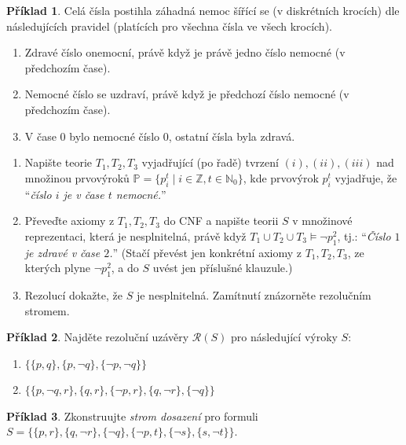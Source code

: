 \documentclass[a4paper]{article}
\theoremstyle{plain}
\theoremstyle{definition}
\newtheorem{problem}{Příklad}
\begin{document}
\medskip\begin{problem}
Celá čísla postihla záhadná nemoc šířící se (v diskrétních krocích) dle následujících pravidel (platících pro všechna čísla ve všech krocích).
\begin{enumerate}[label=(\roman*)]\it
\item Zdravé číslo onemocní, právě když je právě jedno číslo nemocné (v předchozím čase).
\item Nemocné číslo se uzdraví, právě když je předchozí číslo nemocné (v předchozím čase).
\item V čase $0$ bylo nemocné číslo $0$, ostatní čísla byla zdravá.
\end{enumerate}
\begin{enumerate}
\item Napište teorie $T_1, T_2, T_3$ vyjadřující (po řadě) tvrzení $(i), (ii), (iii)$ nad množinou prvovýroků $\mathbb{P}=\{p_i^t \mid i\in\mathbb{Z}, t\in\mathbb{N}_0\}$, kde prvovýrok $p_i^t$ vyjadřuje, že ``{\it číslo $i$ je v čase $t$ nemocné.}''
\item Převeďte axiomy z $T_1, T_2, T_3$ do CNF a napište teorii $S$ v množinové reprezentaci, která je nesplnitelná, právě když $T_1 \cup T_2 \cup T_3 \models \neg p_1^2$, tj.: ``{\it Číslo $1$ je zdravé v čase $2$.}'' (Stačí převést jen konkrétní axiomy z $T_1,T_2,T_3$, ze kterých plyne $\neg p_1^2$, a do $S$ uvést jen příslušné klauzule.)
\item Rezolucí dokažte, že $S$ je nesplnitelná. Zamítnutí znázorněte rezolučním stromem.
\end{enumerate}
\end{problem}


\medskip\begin{problem}
    Najděte rezoluční uzávěry $\mathcal{R}(S)$ pro následující výroky $S$:
    \begin{enumerate}
        \item $\{\{p,q\},\{p,\neg q\},\{\neg p,\neg q\}\}$
        \item $\{\{p,\neg q,r\},\{q,r\},\{\neg p, r\},\{q,\neg r\},\{\neg q\}\}$
    \end{enumerate}
\end{problem}
    
    
\medskip\begin{problem}
    Zkonstruujte \emph{strom dosazení} pro formuli $S=\{\{p,r\},\{q,\neg r\},\{\neg q\},\{\neg p,t\},\{\neg s\},\{s,\neg t\}\}$.
\end{problem}
\end{document}
